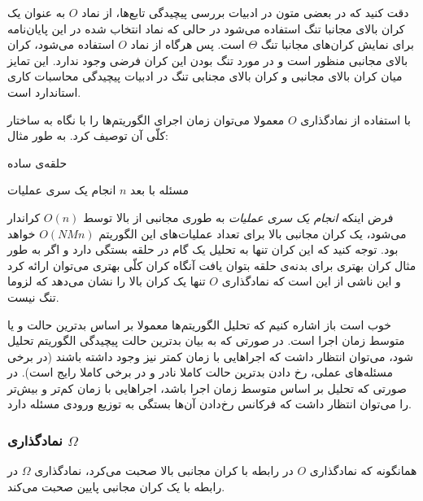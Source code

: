 دقت کنید که در بعضی متون در ادبیات بررسی پیچیدگی تابع‌ها، از نماد
$O$
به عنوان یک کران بالای مجانبا تنگ استفاده می‌شود در حالی که نماد انتخاب شده در این پایان‌نامه برای نمایش کران‌های مجانبا تنگ
$\Theta$
است. پس هرگاه از نماد
$O$
استفاده می‌شود، کران بالای مجانبی منظور است و در مورد تنگ بودن این کران فرضی وجود ندارد. این تمایز میان کران بالای مجانبی و کران بالای مجنابی تنگ در ادبیات پیچیدگی محاسبات کاری استاندارد است.


با استفاده از نمادگذاری
$O$
معمولا می‌توان زمان اجرای الگوریتم‌ها را با نگاه به ساختار کلّی آن توصیف کرد. به طور مثال:
\begin{algorithm}[H]
\caption*{
حلقه‌ی ساده
}
\begin{algorithmic}[1]
\REQUIRE
مسئله با بعد
$n$
  \STATE
  انجام یک سری عملیات
  \ENDFOR
  \ENDFOR
\end{algorithmic}
\end{algorithm}
فرض اینکه
\textit{
انجام یک سری عملیات
}
به طوری مجانبی از بالا توسط
$O( n )$
کراندار می‌شود، یک کران مجانبی بالا برای تعداد عملیات‌های این الگوریتم
$O( N  M n )$
خواهد بود. توجه کنید که این کران تنها به تحلیل یک گام در حلقه بستگی دارد و اگر به طور مثال کران بهتری برای بدنه‌ی حلقه بتوان یافت آنگاه کران کلّی بهتری می‌توان ارائه کرد و این ناشی از این است که نمادگذاری
$O$
تنها یک کران بالا را نشان می‌دهد که لزوما تنگ نیست.


خوب است باز اشاره کنیم که تحلیل الگوریتم‌ها معمولا بر اساس بدترین حالت و یا متوسط زمان اجرا
است. در صورتی که به بیان بدترین حالت پیچیدگی الگوریتم تحلیل شود، می‌توان انتظار داشت که اجراهایی با زمان کمتر نیز وجود داشته باشند (در برخی مسئله‌های عملی، رخ دادن بدترین حالت کاملا نادر و در برخی کاملا رایج است). در صورتی که تحلیل بر اساس متوسط زمان اجرا باشد، اجراهایی با زمان کم‌تر و بیش‌تر را می‌توان انتظار داشت که فرکانس رخ‌دادن آن‌ها بستگی به توزیع ورودی مسئله دارد.


\subsubsection{
نمادگذاری
$\Omega$
}
همانگونه که نمادگذاری
$O$
در رابطه با کران مجانبی بالا صحبت می‌کرد، نمادگذاری
$\Omega$
در رابطه با یک کران مجانبی پایین صحبت می‌کند.

